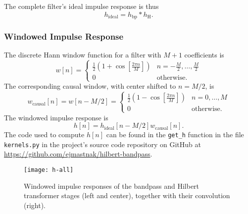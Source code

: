 The complete filter's ideal impulse response is thus
\begin{equation*}
    h_{\mathrm{ideal}} = h_{\mathrm{bp}} * h_{\mathrm{H}}.
\end{equation*}

\subsubsection{Windowed Impulse Response}

The discrete Hann window function for a filter with $ M + 1 $ coefficients is
\begin{equation*}%
    w[n] = 
    \begin{cases}
        \frac{1}{2} \left( 1 + \cos \left[ \frac{2\pi n}{M} \right] \right) & n = - \frac{M}{2}, \ldots, \frac{M}{2}\\
        0 & \text{otherwise}.
    \end{cases}
\end{equation*}
The corresponding causal window, with center shifted to $ n = M/2 $, is
\begin{equation*}
    w_{\mathrm{causal}}[n] = w[n - M/2] = 
    \begin{cases}
        \frac{1}{2} \left( 1 - \cos \left[ \frac{2\pi n}{M} \right] \right) & n = 0, \ldots, M\\
        0 & \text{otherwise}.
    \end{cases}
\end{equation*}
The windowed impulse response is
\begin{equation*}
    h[n] = h_{\mathrm{ideal}}[n - M/2] w_{\mathrm{causal}}[n].
\end{equation*}
The code used to compute $ h[n] $ can be found in the \texttt{get\_h} function in the file \texttt{kernels.py} in the project's source code repository on GitHub at \url{https://github.com/ejmastnak/hilbert-bandpass}.

\begin{figure}[htb!]
	\centering
	\texttt{[image: h-all]}
    \vspace{-3ex}
	\caption{Windowed impulse responses of the bandpass and Hilbert transformer stages (left and center), together with their convolution (right).}
	\label{fig:h-all}
\end{figure}

